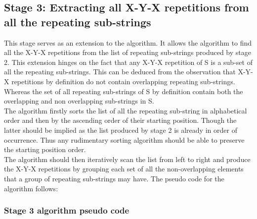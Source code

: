 \documentclass[12pt]{article}
\begin{document}
\begin{flushleft}
	\subsection{Stage 3: Extracting all X-Y-X repetitions from all the repeating sub-strings}
	This stage serves as an extension to the algorithm. It allows the algorithm to find all the X-Y-X repetitions from the list of repeating sub-strings produced by stage 2. This extension hinges on the fact that any X-Y-X repetition of S is a sub-set of all the repeating sub-strings. This can be deduced from the observation that X-Y-X repetitions by definition do not contain overlapping repeating sub-strings. Whereas the set of all repeating sub-strings of S by definition contain both the overlapping and non overlapping sub-strings in S.\\
	The algorithm firstly sorts the list of all the repeating sub-string in alphabetical order and then by the ascending order of their starting position. Though the latter should be implied as the list produced by stage 2 is already in order of occurrence. Thus any rudimentary sorting algorithm should be able to preserve the starting position order.\\
	The algorithm should then iteratively scan the list from left to right and produce the X-Y-X repetitions by grouping each set of all the non-overlapping elements that a group of repeating sub-strings may have. The pseudo code for the algorithm follows:
	\newpage
	\subsubsection{Stage 3 algorithm pseudo code}
\begin{lstlisting}

\end{lstlisting} 
\end{flushleft}
\end{document}
